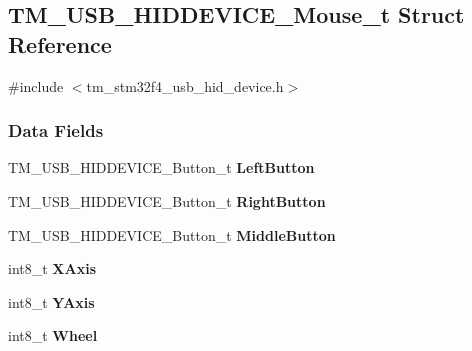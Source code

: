 \hypertarget{struct_t_m___u_s_b___h_i_d_d_e_v_i_c_e___mouse__t}{}\subsection{T\+M\+\_\+\+U\+S\+B\+\_\+\+H\+I\+D\+D\+E\+V\+I\+C\+E\+\_\+\+Mouse\+\_\+t Struct Reference}
\label{struct_t_m___u_s_b___h_i_d_d_e_v_i_c_e___mouse__t}


{\ttfamily \#include $<$tm\+\_\+stm32f4\+\_\+usb\+\_\+hid\+\_\+device.\+h$>$}

\subsubsection*{Data Fields}
\begin{DoxyCompactItemize}
\item 
\hypertarget{struct_t_m___u_s_b___h_i_d_d_e_v_i_c_e___mouse__t_a086dce07ed5c48c3e4f227db40c60e4d}{}T\+M\+\_\+\+U\+S\+B\+\_\+\+H\+I\+D\+D\+E\+V\+I\+C\+E\+\_\+\+Button\+\_\+t {\bfseries Left\+Button}\label{struct_t_m___u_s_b___h_i_d_d_e_v_i_c_e___mouse__t_a086dce07ed5c48c3e4f227db40c60e4d}

\item 
\hypertarget{struct_t_m___u_s_b___h_i_d_d_e_v_i_c_e___mouse__t_ad8ce30d12024b766d1a020838a2e91ee}{}T\+M\+\_\+\+U\+S\+B\+\_\+\+H\+I\+D\+D\+E\+V\+I\+C\+E\+\_\+\+Button\+\_\+t {\bfseries Right\+Button}\label{struct_t_m___u_s_b___h_i_d_d_e_v_i_c_e___mouse__t_ad8ce30d12024b766d1a020838a2e91ee}

\item 
\hypertarget{struct_t_m___u_s_b___h_i_d_d_e_v_i_c_e___mouse__t_a8f426ee1c56e40d8af1f0a06beede4b1}{}T\+M\+\_\+\+U\+S\+B\+\_\+\+H\+I\+D\+D\+E\+V\+I\+C\+E\+\_\+\+Button\+\_\+t {\bfseries Middle\+Button}\label{struct_t_m___u_s_b___h_i_d_d_e_v_i_c_e___mouse__t_a8f426ee1c56e40d8af1f0a06beede4b1}

\item 
\hypertarget{struct_t_m___u_s_b___h_i_d_d_e_v_i_c_e___mouse__t_af3179c741a3abf6664e52193b5b8a378}{}int8\+\_\+t {\bfseries X\+Axis}\label{struct_t_m___u_s_b___h_i_d_d_e_v_i_c_e___mouse__t_af3179c741a3abf6664e52193b5b8a378}

\item 
\hypertarget{struct_t_m___u_s_b___h_i_d_d_e_v_i_c_e___mouse__t_a0779c9fcfb6f960ea099c77a49d7718b}{}int8\+\_\+t {\bfseries Y\+Axis}\label{struct_t_m___u_s_b___h_i_d_d_e_v_i_c_e___mouse__t_a0779c9fcfb6f960ea099c77a49d7718b}

\item 
\hypertarget{struct_t_m___u_s_b___h_i_d_d_e_v_i_c_e___mouse__t_a0c08e723b1fa686c1f41e8efed60759e}{}int8\+\_\+t {\bfseries Wheel}\label{struct_t_m___u_s_b___h_i_d_d_e_v_i_c_e___mouse__t_a0c08e723b1fa686c1f41e8efed60759e}

\end{DoxyCompactItemize}


